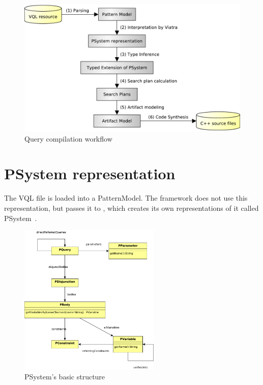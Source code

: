 \begin{figure}[h]
	\begin{center}
		\includegraphics[width=\textwidth]{figures/query-compilation-workflow.pdf}
		\caption{Query compilation workflow}
		\label{figure:query-compile-workflow}
	\end{center}
\end{figure}




\section{PSystem representation}


The VQL file is loaded into a PatternModel. 
The framework does not use this representation, but passes it to \viatra, which creates its own representations of it called PSystem~\cite{psystem}. 


\begin{figure}[H]
	\begin{center}
		\includegraphics[width=0.6\textwidth]{figures/psystem.pdf}
		\caption{PSystem's basic structure}
		\label{fig:psystem}
	\end{center}
\end{figure}

